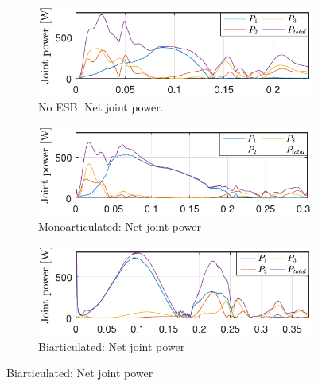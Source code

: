 \documentclass[letterpaper, 10 pt, conference]{ieeeconf}  %
\begin{document}
\begin{figure}[ht]
		\begin{subfigure}[t]{0.32\linewidth}
			\includegraphics[width=\linewidth]{noESB/P_q}
			\caption{No ESB: Net joint power.}
			\label{fig:noESB_P_q}
		\end{subfigure}
		\begin{subfigure}[t]{0.32\linewidth}
			\includegraphics[width=\linewidth]{mono/P_q}
			\caption{Monoarticulated: Net joint power}
			\label{fig:mono_P_q}
		\end{subfigure}
		\begin{subfigure}[t]{0.32\linewidth}
			\includegraphics[width=\linewidth]{bi/P_q}
			\caption{Biarticulated: Net joint power}
			\label{fig:bi_P_q}
		\end{subfigure}
		
		\vspace{1mm}
		

\end{figure}
\end{document}
